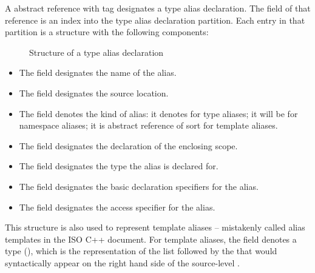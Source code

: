 A  abstract reference with tag  designates a type alias declaration.
The  field of that reference is an index into the type alias declaration partition.
Each entry in that partition is a structure with the following components:
%
\begin{figure}[H]
	\centering
	\caption{Structure of a type alias declaration}
	\label{fig:ifc-type-alias-decl-structure}
\end{figure}
%
\begin{itemize}
	\item The  field designates the name of the alias.
	\item The  field designates the source location.
	\item The  field denotes the kind of alias: it denotes  for type aliases; it will be  for namespace aliases; it is abstract reference of sort  for template aliases.
	\item The  field designates the declaration of the enclosing scope.
	\item The  field designates the type the alias is declared for.
	\item The  field designates the basic declaration specifiers for the alias.
	\item The  field designates the access specifier for the alias.
\end{itemize}

This structure is also used to represent template aliases -- mistakenly called alias templates in the ISO C++ document.  For template aliases,
the  field denotes a  type (), which is the representation of the  list followed by the  
that would syntactically appear on the right hand side of the source-level .


